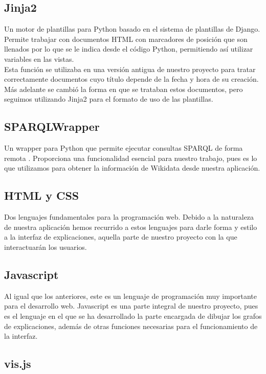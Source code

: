 \subsection*{Jinja2}

Un motor de plantillas para Python basado en el sistema de plantillas de Django. Permite trabajar con documentos HTML con marcadores de posición que son llenados por lo que se le indica desde el código Python, permitiendo así utilizar variables en las vistas.\\

Esta función se utilizaba en una versión antigua de nuestro proyecto para tratar correctamente documentos cuyo título depende de la fecha y hora de su creación. Más adelante se cambió la forma en que se trataban estos documentos, pero seguimos utilizando Jinja2 para el formato de uso de las plantillas.

\subsection*{SPARQLWrapper}

Un wrapper para Python que permite ejecutar consultas SPARQL de forma remota \cite{sparqlwrapper}. Proporciona una funcionalidad esencial para nuestro trabajo, pues es lo que utilizamos para obtener la información de Wikidata desde nuestra aplicación.

\subsection*{HTML y CSS}

Dos lenguajes fundamentales para la programación web. Debido a la naturaleza de nuestra aplicación hemos recurrido a estos lenguajes para darle forma y estilo a la interfaz de explicaciones, aquella parte de nuestro proyecto con la que interactuarán los usuarios.

\subsection*{Javascript}

Al igual que los anteriores, este es un lenguaje de programación muy importante para el desarrollo web. Javascript es una parte integral de nuestro proyecto, pues es el lenguaje en el que se ha desarrollado la parte encargada de dibujar los grafos de explicaciones, además de otras funciones necesarias para el funcionamiento de la interfaz.

\subsection*{vis.js}

